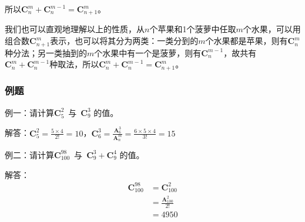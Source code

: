 \documentclass[a5paper]{article}
\begin{document}
所以$\textbf{C}_{n}^{m}+\textbf{C}_{n}^{m-1}=\textbf{C}_{n+1}^{m}$。

我们也可以直观地理解以上的性质，从$n$个苹果和1个菠萝中任取$m$个水果，可以用组合数$\textbf{C}_{n+1}^{m}$表示，也可以将其分为两类：一类分到的$m$个水果都是苹果，则有$\textbf{C}_{n}^{m}$种分法；另一类抽到的$m$个水果中有一个是菠萝，则有$\textbf{C}_{n}^{m-1}$，故共有$\textbf{C}_{n}^{m}+\textbf{C}_{n}^{m-1}$种取法，所以$\textbf{C}_{n}^{m}+\textbf{C}_{n}^{m-1}=\textbf{C}_{n+1}^{m}$。

\subsubsection{例题}

{\color{blue} 例一：}{请计算$\textbf{C}_{5}^{2}$}~与~$\textbf{C}_{9}^{3}$ 的值。

{\color{blue} 解答：}$\textbf{C}_{5}^{2}=\frac{5\times{}4}{2!}=10$，$\textbf{C}_{6}^{3}=\frac{\textbf{A}_{6}^{3}}{\textbf{A}_{n}^{m}}=\frac{6\times{}5\times{}4}{3!} = 15$

{\color{blue} 例二：}{请计算$\textbf{C}_{100}^{98}$}~与~$\textbf{C}_{9}^{3}+\textbf{C}_{9}^{4}$ 的值。

{\color{blue} 解答：}
\begin{equation*}
    \begin{aligned}
        \textbf{C}_{100}^{98} &= \textbf{C}_{100}^{2} \\
        &=  \frac{\textbf{A}_{100}^{2}}{2!} \\
        &= 4950
    \end{aligned}
\end{equation*}
\end{document}
